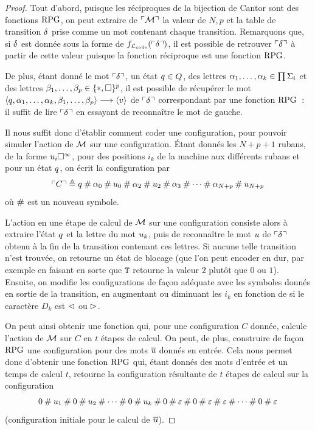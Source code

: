 \begin{proof}
  Tout d'abord, puisque les réciproques de la bijection de Cantor sont des
  fonctions $\operatorname{RPG}$, on peut extraire de $\ulcorner\mathcal{M}\urcorner$ la valeur de $N,p$ et
  la table de transition $\delta_{}$ prise comme un mot contenant chaque
  transition. Remarquons que, si $\delta_{}$ est donnée sous la forme de
  $f_{\mathcal L_{\operatorname{code}}}(\ulcorner\delta_{}\urcorner)$, il est possible de retrouver
  $\ulcorner\delta_{}\urcorner$ à partir de cette valeur puisque la fonction réciproque est
  une fonction $\operatorname{RPG}$.

  De plus, étant donné le mot $\ulcorner\delta_{}\urcorner$, un état $q_{} \in Q_{}$, des
  lettres $\alpha_1,\ldots, \alpha_k \in \prod \Sigma_i$ et des lettres
  $\beta_1,\ldots,\beta_p \in \{*,\square\}^p$, il est possible de récupérer le
  mot $\langle q_{},\alpha_1,\ldots,\alpha_k,\beta_1,\ldots,\beta_p \rangle
  \longrightarrow \langle v \rangle$
  de $\ulcorner\delta_{}\urcorner$ correspondant par une fonction $\operatorname{RPG}$~: il suffit de lire
  $\ulcorner\delta_{}\urcorner$ en essayant de reconnaître le mot de gauche.

  Il nous suffit donc d'établir comment coder une configuration, pour pouvoir
  simuler l'action de $\mathcal{M}$ sur une configuration. \'Etant donnés les
  $N+p+1$ rubans, de la forme $u_i\square^{\infty}$, pour des positions $i_k$ de
  la machine aux différents rubans et pour un état $q_{}$, on écrit la
  configuration par
  \[\ulcorner C\urcorner \triangleq q_{}\mathbin{\#} \alpha_0\mathbin{\#} u_0\mathbin{\#}
  \alpha_2\mathbin{\#}u_2\mathbin{\#}\alpha_3\mathbin{\#}\cdots\mathbin{\#}\alpha_{N+p}
  \mathbin{\#}u_{N+p}\]
  où $\mathbin{\#}$ est un nouveau symbole.

  L'action en une étape de calcul de $\mathcal{M}$ sur une configuration consiste
  alors à extraire l'état $q_{}$ et
  la  lettre du mot $u_k$, puis de
  reconnaître le mot $u$ de $\ulcorner\delta_{}\urcorner$ obtenu à la fin de la
  transition contenant ces lettres. Si aucune telle transition n'est trouvée, on
  retourne un état de blocage (que l'on peut encoder en dur, par exemple en
  faisant en sorte que ${\normalfont\texttt{T}}$ retourne la valeur $2$ plutôt que $0$ ou $1$).
  Ensuite, on modifie les configurations de façon adéquate avec les symboles
  donnés en sortie de la transition, en augmentant ou diminuant les $i_k$ en
  fonction de si le caractère $D_k$ est $\lhd$ ou $\rhd$.

  On peut ainsi obtenir une fonction qui, pour une configuration $C$ donnée,
  calcule l'action de $\mathcal{M}$ sur $C$ en $t$ étapes de calcul. On peut, de
  plus, construire de façon $\operatorname{RPG}$ une configuration pour des mots
  $\overline{u}$ donnés en entrée. Cela nous permet donc d'obtenir une fonction
  $\operatorname{RPG}$ qui, étant donnés des mots d'entrée et un temps de calcul $t$, retourne
  la configuration résultante de $t$ étapes de calcul sur la configuration
  \[0\mathbin{\#}u_1\mathbin{\#} 0\mathbin{\#}u_2\mathbin{\#}\cdots
  \mathbin{\#} 0\mathbin{\#}u_k\mathbin{\#} 0\mathbin{\#}\varepsilon\mathbin{\#} 
  0\mathbin{\#}\varepsilon\mathbin{\#}\varepsilon\mathbin{\#}
  \cdots\mathbin{\#} 0\mathbin{\#}\varepsilon\]
  (configuration initiale pour le calcul de $\overline{u}$).


\end{proof}
